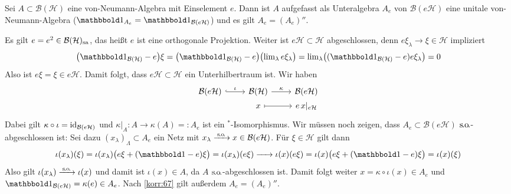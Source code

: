\begin{proposition}[{name=[von-Neumann-Algebra als unitale von-Neumann-Algebra auffassen]}]
	Sei $A \subset \mathcal{B}(\mathcal{H})$ eine von-Neumann-Algebra mit Einselement $e$.
	Dann ist $A$ aufgefasst als Unteralgebra $A_e$ von $\mathcal{B}(e \mathcal{H})$ eine unitale von-Neumann-Algebra ($\ind_{A_e}= \ind_{\mathcal{B}(e \mathcal{H})}$) und es gilt $A_e = (A_e)''$.
\end{proposition}
\begin{beweis}
	Es gilt $e=e^2 \in \mathcal{B}(\mathcal{H})_{\mathrm{sa}}$, das heißt $e$ ist eine orthogonale Projektion.
	Weiter ist $e \mathcal{H} \subset \mathcal{H}$ abgeschlossen, denn $e \xi_\lambda \to \xi \in \mathcal{H}$ impliziert
	\[
		\enbrace*{\ind_{\mathcal{B}(\mathcal{H})} - e} \xi = \enbrace*{\ind_{\mathcal{B}(\mathcal{H})}- e} \enbrace[\big]{\lim\nolimits_\lambda e \xi_\lambda} = \lim\nolimits_\lambda \enbrace*{(\ind_{\mathcal{B}(\mathcal{H})}-e) e \xi_\lambda} = 0
	\]
	Also ist $e\xi=\xi \in e \mathcal{H}$.
	Damit folgt, dass $e \mathcal{H} \subset \mathcal{H}$ ein Unterhilbertraum ist. Wir haben
	\[
		\begin{tikzcd}[row sep=0pt]
			\mathcal{B}(e \mathcal{H}) \rar[hook,"\iota"] & \mathcal{B}(\mathcal{H}) \rar["\kappa"] & \mathcal{B}(e \mathcal{H}) \\
			& x \rar[mapsto] & e \, x|_{e \mathcal{H}}
		\end{tikzcd}
	\]
	Dabei gilt $\kappa \circ \iota = \operatorname{id}_{\mathcal{B}(e\mathcal{H})}$ und $\kappa|_A \colon A \to \kappa(A) =: A_e$ ist ein $^*$-Isomorphismus.
	Wir müssen noch zeigen, dass $A_e \subset \mathcal{B}(e\mathcal{H})$ $\mathrm{\mkern.3mu s\mkern-1.4mu.\mkern-.6mu o\mkern-1.7mu.}$-abgeschlossen ist:
	Sei dazu $(x_\lambda)_\Lambda \subset A_e$ ein Netz mit $x_\lambda \grenzw{\raisemath{-3pt}{\so}} x \in \mathcal{B}(e \mathcal{H})$.
	Für $\xi \in \mathcal{H}$ gilt dann
	\[
		\iota(x_\lambda) (\xi) = \iota(x_\lambda) \enbrace[\big]{e \xi + (\ind -e) \xi} = \iota(x_\lambda)(e \xi) \grenzw{} \iota(x)(e \xi) = \iota(x) \enbrace[\big]{e \xi + (\ind -e) \xi} = \iota(x) (\xi)
	\]
	Also gilt $\iota(x_\lambda) \grenzw{\raisemath{-3pt}{\so}} \iota(x)$ und damit ist $\iota(x) \in A$, da $A$ $\mathrm{\mkern.3mu s\mkern-1.4mu.\mkern-.6mu o\mkern-1.7mu.}$-abgeschlossen ist.
	Damit folgt weiter $x = \kappa \circ \iota(x) \in  A_e$ und $\ind_{\mathcal{B}(e \mathcal{H})} = \kappa(e) \in A_e$. Nach \autoref{korr:67} gilt außerdem $A_e= (A_e)''$.
\end{beweis}

